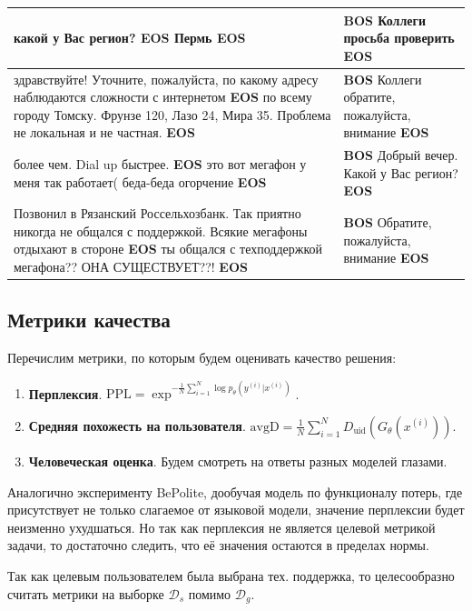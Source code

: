 \documentclass[12pt,a4paper]{amsart}
\begin{document}
\begin{center}
\begin{table}[!hbtp]
\begin{tabulary}{\textwidth}{|L|L|}
			\hline
			какой у Вас регион? \textbf{EOS} Пермь \textbf{EOS} & \textbf{BOS} Коллеги просьба проверить \textbf{EOS} \\
			\hline
			здравствуйте! Уточните, пожалуйста, по какому адресу наблюдаются сложности с интернетом \textbf{EOS} по всему городу Томску. Фрунзе 120, Лазо 24, Мира 35. Проблема не локальная и не частная. \textbf{EOS} & \textbf{BOS} Коллеги обратите, пожалуйста, внимание \textbf{EOS} \\
			\hline
			более чем. Dial up быстрее. \textbf{EOS} это вот мегафон у меня так работает( беда-беда огорчение \textbf{EOS} & \textbf{BOS} Добрый вечер. Какой у Вас регион? \textbf{EOS} \\
			\hline
			Позвонил в Рязанский Россельхозбанк. Так приятно никогда не общался с поддержкой. Всякие мегафоны отдыхают в стороне \textbf{EOS} ты общался с техподдержкой мегафона?? ОНА СУЩЕСТВУЕТ??! \textbf{EOS} & \textbf{BOS} Обратите, пожалуйста, внимание \textbf{EOS} \\
			
 		\end{tabulary}
	\end{table}
\end{center}


\subsection{Метрики качества}

Перечислим метрики, по которым будем оценивать качество решения:

\begin{enumerate}
	\item \textbf{Перплексия}. $\text{PPL} = \exp^{-\frac{1}{N}\sum_{i=1}^N \log p_\theta (y^{(i)} | x^{(i)})}$.
	\item \textbf{Средняя похожесть на пользователя}. $\text{avgD} = \frac{1}{N}\sum_{i=1}^N D_{\text{uid}}(G_\theta(x^{(i)}))$.
	\item \textbf{Человеческая оценка}. Будем смотреть на ответы разных моделей глазами.
\end{enumerate}


Аналогично эксперименту BePolite, дообучая модель по функционалу потерь, где присутствует не только слагаемое от языковой модели, значение перплексии будет неизменно ухудшаться. Но так как перплексия не является целевой метрикой задачи, то достаточно следить, что её значения остаются в пределах нормы.

Так как целевым пользователем была выбрана тех. поддержка, то целесообразно считать метрики на выборке $\mathcal{D}_s$ помимо $\mathcal{D}_g$.
\end{document}
